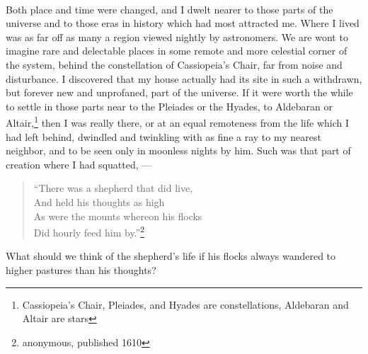 \documentclass[letterpaper,12pt]{article}
\begin{document}
\paragraph{} Both place and time were changed, and I dwelt nearer to those parts
of the universe and to those eras in history which had most attracted me. Where
I lived was as far off as many a region viewed nightly by astronomers. We are
wont to imagine rare and delectable places in some remote and more celestial
corner of the system, behind the constellation of Cassiopeia's Chair, far from
noise and disturbance. I discovered that my house actually had its site in such
a withdrawn, but forever new and unprofaned, part of the universe. If it were
worth the while to settle in those parts near to the Pleiades or the Hyades, to
Aldebaran or Altair,\footnote{Cassiopeia's Chair, Pleiades, and Hyades are
    constellations, Aldebaran and Altair are stars}  then I was really there, or
at an equal remoteness from the life which I had left behind, dwindled and
twinkling with as fine a ray to my nearest neighbor, and to be seen only in
moonless nights by him. Such was that part of creation where I had squatted, ---

\begin{verse}
    \enquote{There was a shepherd that did live, \\
        And held his thoughts as high \\
        As were the mounts whereon his flocks \\
        Did hourly feed him by.}\footnote{anonymous, published 1610}
\end{verse}

What should we think of the shepherd's life if his flocks always wandered to
higher pastures than his thoughts?
\end{document}
